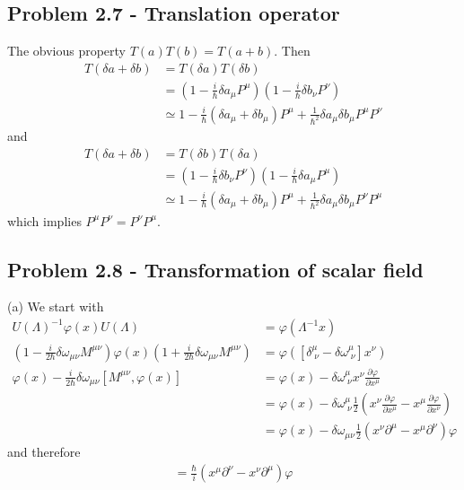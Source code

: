 \documentclass[10pt,a4paper]{book}
\theoremstyle{definition}
\begin{document}
\subsection{Problem 2.7 - Translation operator}
The obvious property $T(a)T(b)=T(a+b)$. Then
\begin{align}
T(\delta a+\delta b)&=T(\delta a)T(\delta b)\\
&=\left(1-\frac{i}{\hbar}\delta a_\mu P^\mu\right)\left(1-\frac{i}{\hbar}\delta b_\nu P^\nu\right)\\
&\simeq 1-\frac{i}{\hbar}(\delta a_\mu +\delta b_\mu) P^\mu+\frac{1}{\hbar^2}\delta a_\mu\delta b_\mu P^\mu P^\nu
\end{align}
and 
\begin{align}
T(\delta a+\delta b)&=T(\delta b)T(\delta a)\\
&=\left(1-\frac{i}{\hbar}\delta b_\nu P^\nu\right)\left(1-\frac{i}{\hbar}\delta a_\mu P^\mu\right)\\
&\simeq 1-\frac{i}{\hbar}(\delta a_\mu +\delta b_\mu) P^\mu+\frac{1}{\hbar^2}\delta a_\mu\delta b_\mu P^\nu P^\mu
\end{align}
which implies $P^\mu P^\nu=P^\nu P^\mu$.

\subsection{Problem 2.8 - Transformation of scalar field}
(a) We start with
\begin{align}
U(\Lambda)^{-1}\varphi(x)U(\Lambda)&=\varphi(\Lambda^{-1}x)\\
\left(1-\frac{i}{2\hbar}\delta\omega_{\mu\nu}M^{\mu\nu}\right)\varphi(x)\left(1+\frac{i}{2\hbar}\delta\omega_{\mu\nu}M^{\mu\nu}\right)&=\varphi([\delta^\mu_{\;\nu}-\delta\omega^\mu_{\;\nu}]x^\nu)\\
\varphi(x)-\frac{i}{2\hbar}\delta\omega_{\mu\nu}[M^{\mu\nu},\varphi(x)]&=\varphi(x)-\delta\omega^\mu_{\;\nu}x^\nu\frac{\partial\varphi}{\partial x^\mu}\\
&=\varphi(x)-\delta\omega^\mu_{\;\nu}\frac{1}{2}\left(x^\nu\frac{\partial\varphi}{\partial x^\mu}-x^\mu\frac{\partial\varphi}{\partial x^\nu}\right)\\
&=\varphi(x)-\delta\omega_{\mu\nu}\frac{1}{2}\left(x^\nu\partial^\mu-x^\mu\partial^\nu\right)\varphi
\end{align}
and therefore
\begin{align}
[\varphi,M^{\mu\nu}]=\frac{\hbar}{i}(x^\mu\partial^\nu-x^\nu\partial^\mu)\varphi
\end{align}
\end{document}
